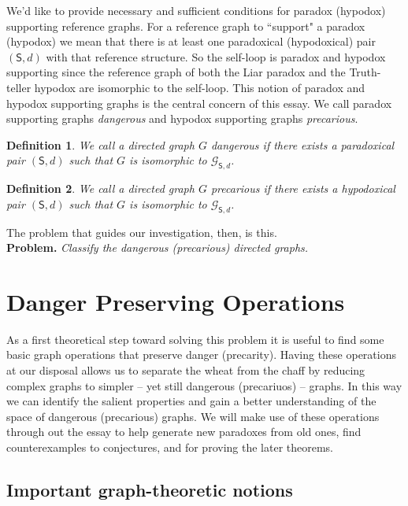 \documentclass[12pt]{article}
\newtheorem{defn}{Definition}
\theoremstyle{remark}
\newcommand{\fancy}[1]{\mathcal{#1}}
\def\S{\textsf{S}}
\def\G{\fancy{G}}
\begin{document}
We'd like to provide necessary and sufficient conditions for paradox (hypodox) supporting reference graphs. For a reference graph to ``support" a paradox (hypodox) we mean that there is at least one paradoxical (hypodoxical) pair $(\S, d)$ with that reference structure. So the self-loop is paradox and hypodox supporting since the reference graph of both the Liar paradox and the Truth-teller hypodox are isomorphic to the self-loop. This notion of paradox and hypodox supporting graphs is the central concern of this essay. We call paradox supporting graphs \textit{dangerous} and hypodox supporting graphs \textit{precarious}.

\begin{defn} 
We call a directed graph $G$ \emph{dangerous} if there exists a paradoxical pair $(\S, d)$ such that $G$ is isomorphic to $\G_{\S, d}$.
\end{defn}

\begin{defn}
We call a directed graph $G$ \emph{precarious} if there exists a hypodoxical pair $(\S, d)$ such that $G$ is isomorphic to $\G_{\S, d}$.\\
\end{defn}

The problem that guides our investigation, then, is this.\\

\textbf{Problem.} \textit{Classify the dangerous (precarious) directed graphs.}


\section{Danger Preserving Operations}
\label{sec3}

As a first theoretical step toward solving this problem it is useful to find some basic graph operations that preserve danger (precarity). Having these operations at our disposal allows us to separate the wheat from the chaff by reducing complex graphs to simpler -- yet still dangerous (precariuos) -- graphs. In this way we can  identify the salient properties and gain a better understanding of the space of dangerous (precarious) graphs. We will make use of these operations through out the essay to help generate new paradoxes from old ones, find counterexamples to conjectures, and for proving the later theorems.

\subsection{Important graph-theoretic notions}
\end{document}
